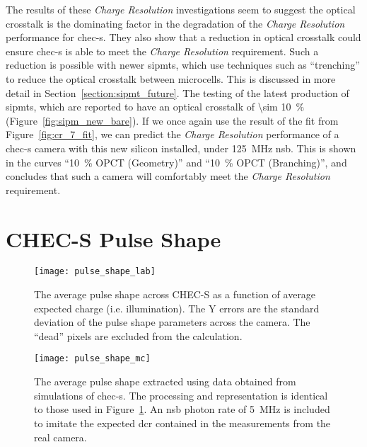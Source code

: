 The results of these \textit{Charge Resolution} investigations seem to suggest the optical crosstalk is the dominating factor in the degradation of the \textit{Charge Resolution} performance for \gls{chec-s}. They also show that a reduction in optical crosstalk could ensure \gls{chec-s} is able to meet the \textit{Charge Resolution} requirement. Such a reduction is possible with newer \glspl{sipmt}, which use techniques such as ``trenching'' to reduce the optical crosstalk between microcells. This is discussed in more detail in Section~\ref{section:sipmt_future}. The testing of the latest production of \glspl{sipmt}, which are reported to have an optical crosstalk of \SI{\sim 10}{\percent} (Figure~\ref{fig:sipm_new_bare}). If we once again use the result of the fit from Figure~\ref{fig:cr_7_fit}, we can predict the \textit{Charge Resolution} performance of a \gls{chec-s} camera with this new silicon installed, under \SI{125}{MHz} \gls{nsb}. This is shown in the curves ``\SI{10}{\percent} OPCT (Geometry)'' and ``\SI{10}{\percent} OPCT (Branching)'', and concludes that such a camera will comfortably meet the \textit{Charge Resolution} requirement.

\section{CHEC-S Pulse Shape} \label{section:pulse_shape_results}

\begin{figure}
	\centering
    \texttt{[image: pulse\_shape\_lab]} 
	\caption[Pulse shape versus average expected charge for CHEC-S.]{The average pulse shape across CHEC-S as a function of average expected charge (i.e. illumination). The Y errors are the standard deviation of the pulse shape parameters across the camera. The ``dead'' pixels are excluded from the calculation.}
	\label{fig:pulse_shape_lab}
\end{figure}

\begin{figure}
	\centering
    \texttt{[image: pulse\_shape\_mc]} 
	\caption[Pulse shape versus average expected charge for a CHEC-S simulation.]{The average pulse shape extracted using data obtained from simulations of \gls{chec-s}. The processing and representation is identical to those used in Figure~\ref{fig:pulse_shape_lab}. An \gls{nsb} photon rate of \SI{5}{MHz} is included to imitate the expected \gls{dcr} contained in the measurements from the real camera.}
	\label{fig:pulse_shape_mc}
\end{figure}

